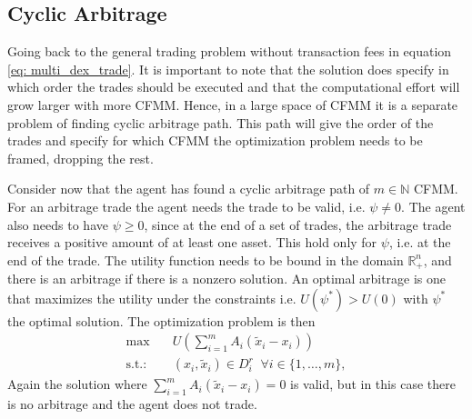 \subsection{Cyclic Arbitrage}
Going back to the general trading problem without transaction fees in
equation \ref{eq: multi_dex_trade}. It is important to note that the solution
does specify in which order the trades should be executed and that the
computational effort will grow larger with more CFMM. Hence, in a large space
of CFMM it is a separate problem of finding cyclic arbitrage path. This path
will give the order of the trades and specify for which CFMM the optimization
problem needs to be framed, dropping the rest.

Consider now that the agent has found a cyclic arbitrage path of $m \in
\mathbb{N} $ CFMM. For an arbitrage trade the agent needs the trade to be
valid, i.e. $\psi \neq 0$. The agent also needs to have $\psi \ge 0$, since
at the end of a set of trades, the arbitrage trade receives a positive amount
of at least one asset. This hold only for $\psi$, i.e. at the end of the
trade. The utility function needs to be bound in the domain
$\mathbb{R}_+^{n}$, and there is an arbitrage if there is a nonzero solution.
An optimal arbitrage is one that maximizes the utility under the constraints
i.e. $U(\psi^{*}) > U(0)$ with $\psi^{*}$ the optimal solution. The
optimization problem is then
\begin{align}
    \text{max} \quad &U\left(\sum_{i=1}^{m} A_i(\tilde{x}_i-x_i)\right) \label{eq: arb_trade}\\
    \text{s.t.:}\quad & (x_i, \tilde{x}_i) \in D_i^{r}
          \;\; \forall i \in
          \{1,\ldots,m\},
\end{align}
Again the solution where $\sum_{i=1}^{m} A_i(\tilde{x}_i-x_i)=0$ is valid, but in this case there is no arbitrage
and the agent does not trade.
